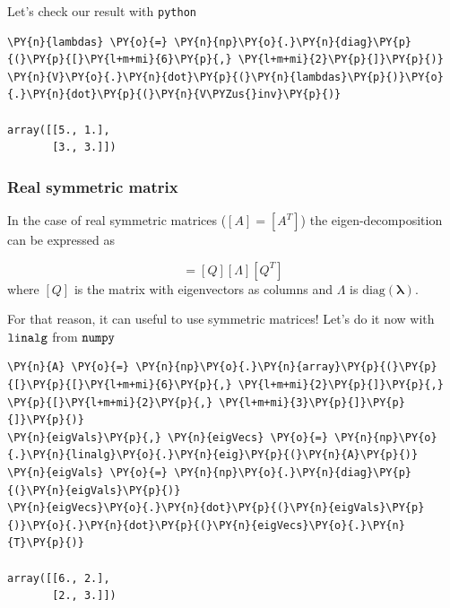 Let's check our result with \texttt{python}

\begin{tcolorbox}[breakable, size=fbox, boxrule=1pt, pad at break*=1mm,colback=cellbackground, colframe=cellborder]
\begin{Verbatim}[commandchars=\\\{\}]
\PY{n}{lambdas} \PY{o}{=} \PY{n}{np}\PY{o}{.}\PY{n}{diag}\PY{p}{(}\PY{p}{[}\PY{l+m+mi}{6}\PY{p}{,} \PY{l+m+mi}{2}\PY{p}{]}\PY{p}{)}
\PY{n}{V}\PY{o}{.}\PY{n}{dot}\PY{p}{(}\PY{n}{lambdas}\PY{p}{)}\PY{o}{.}\PY{n}{dot}\PY{p}{(}\PY{n}{V\PYZus{}inv}\PY{p}{)}

array([[5., 1.],
       [3., 3.]])
\end{Verbatim}
\end{tcolorbox}

\subsubsection{Real symmetric matrix}
\label{real-symmetric-matrix}

In the case of real symmetric matrices (\([A]=[A^T]\)) the
eigen-decomposition can be expressed as

\begin{equation}
[A]=[Q][\Lambda][Q^T]
\end{equation} 
where \([Q]\) is the matrix with eigenvectors
as columns and \(\Lambda\) is \(\textrm{diag}(\boldsymbol{\lambda})\).

For that reason, it can useful to use symmetric matrices! Let's do it
now with \(\tt{linalg}\) from \(\tt{numpy}\)

\begin{tcolorbox}[breakable, size=fbox, boxrule=1pt, pad at break*=1mm,colback=cellbackground, colframe=cellborder]
\begin{Verbatim}[commandchars=\\\{\}]
\PY{n}{A} \PY{o}{=} \PY{n}{np}\PY{o}{.}\PY{n}{array}\PY{p}{(}\PY{p}{[}\PY{p}{[}\PY{l+m+mi}{6}\PY{p}{,} \PY{l+m+mi}{2}\PY{p}{]}\PY{p}{,} \PY{p}{[}\PY{l+m+mi}{2}\PY{p}{,} \PY{l+m+mi}{3}\PY{p}{]}\PY{p}{]}\PY{p}{)}
\PY{n}{eigVals}\PY{p}{,} \PY{n}{eigVecs} \PY{o}{=} \PY{n}{np}\PY{o}{.}\PY{n}{linalg}\PY{o}{.}\PY{n}{eig}\PY{p}{(}\PY{n}{A}\PY{p}{)}
\PY{n}{eigVals} \PY{o}{=} \PY{n}{np}\PY{o}{.}\PY{n}{diag}\PY{p}{(}\PY{n}{eigVals}\PY{p}{)}
\PY{n}{eigVecs}\PY{o}{.}\PY{n}{dot}\PY{p}{(}\PY{n}{eigVals}\PY{p}{)}\PY{o}{.}\PY{n}{dot}\PY{p}{(}\PY{n}{eigVecs}\PY{o}{.}\PY{n}{T}\PY{p}{)}

array([[6., 2.],
       [2., 3.]])
\end{Verbatim}
\end{tcolorbox}

